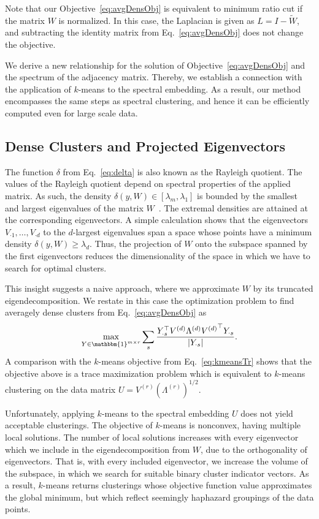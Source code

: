 Note that our Objective~\eqref{eq:avgDensObj} is equivalent to minimum ratio cut if the matrix $W$ is normalized. In this case, the Laplacian is given as $L=I-\tilde{W}$, and subtracting the identity matrix from Eq.~\eqref{eq:avgDensObj} does not change the objective.

We derive a new relationship for the solution of Objective~\eqref{eq:avgDensObj} and the spectrum of the adjacency matrix. Thereby, we establish a connection with the application of $k$-means to the spectral embedding. As a result, our method encompasses the same steps as spectral clustering, and hence it can be efficiently computed even for large scale data. 
\subsection{Dense Clusters and Projected Eigenvectors}
The function $\delta$ from Eq.~\eqref{eq:delta} is also known as the Rayleigh quotient. The values of the Rayleigh quotient 
depend on spectral properties of the applied matrix. As such, the density $\delta(y,W)\in [\lambda_m,\lambda_1]$ is bounded by the smallest and largest eigenvalues of the matrix $W$~\citep{collatz1978spektren}. The extremal densities are attained at the corresponding eigenvectors. A simple calculation shows that the eigenvectors $V_{\cdot 1},\ldots,V_{\cdot d}$ to the $d$-largest eigenvalues span a space whose points have a minimum density $\delta(y,W)\geq\lambda_d$. 
Thus, the projection of $W$ onto the subspace spanned by the first eigenvectors reduces the dimensionality of the space in which we have to search for optimal clusters.

 This insight suggests a naive approach, where we approximate $W$ by its truncated eigendecomposition. We restate in this case the optimization problem to find averagely dense clusters from Eq.~\eqref{eq:avgDensObj} as
\begin{align}\label{eq:approxTrunc}
\max_{Y\in\mathbbm{1}^{m\times r}} \sum_s \frac{Y_{\cdot s}^\top V^{(d)}\Lambda^{(d)} {V^{(d)}}^\top Y_{\cdot s}}{|Y_{\cdot s}|}.
\end{align}
A comparison with the $k$-means objective from Eq.~\eqref{eq:kmeansTr} shows that the objective above is a trace maximization problem which is equivalent to $k$-means clustering on the data matrix $U=V^{(r)}\left(\Lambda^{(r)}\right)^{1/2}$. 

Unfortunately, applying $k$-means to the spectral embedding $U$ does not yield acceptable clusterings. The objective of $k$-means is nonconvex, having multiple local solutions. The number of local solutions increases with every eigenvector which we include in the eigendecomposition from $W$, due to the orthogonality of eigenvectors. That is, with every included eigenvector, we increase the volume of the subspace, in which we search for suitable binary cluster indicator vectors. As a result, $k$-means returns clusterings whose objective function value approximates the global minimum, but which reflect seemingly haphazard groupings of the data points.

